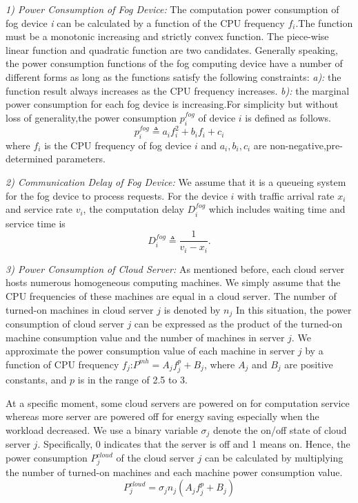 \documentclass[twoside,twocolumn]{article}
\begin{document}
\textit{1) Power Consumption of Fog Device:} The computation power consumption of fog device \textit{i} can be calculated by a function of the CPU frequency $f_i$.The function must be a monotonic increasing and strictly convex function. The piece-wise linear function and quadratic function are two candidates. Generally speaking, the power consumption functions of the fog computing device have a number of different forms as long as the functions satisfy the following constraints: \textit{a):}  the function result always increases as the CPU frequency increases. \textit{b):} the marginal power consumption for each fog device is increasing.For simplicity but without loss of generality,the power consumption $p_i^{fog} $ of device $i$ is defined as follows.
$$ p_i^{fog} \triangleq a_if_i^2+b_if_i+c_i $$
where $f_i$ is the CPU frequency of fog device $i$ and $a_i,b_i,c_i$ are non-negative,pre-determined parameters. 

\textit{2) Communication Delay of Fog Device:} We assume that it is a queueing system for the fog device to process requests. For the device $i$ with traffic arrival rate $x_i$ and service rate $v_i$, the computation delay $D_i^{fog}$ which includes waiting time and service time is 
$$ D_i^{fog} \triangleq \frac{1}{v_i-x_i} .$$

\textit{3) Power Consumption of Cloud Server:} As mentioned before, each cloud server hosts numerous homogeneous computing machines. We simply assume that the CPU frequencies of these machines are equal in a cloud server. The number of turned-on machines in cloud server $j$ is denoted by $n_j$ In this situation, the power consumption of cloud server $j$ can be expressed as the product of the turned-on machine consumption value and the number of machines in server $j$. We approximate the power consumption value of each machine in server $j$ by a function of CPU frequency $f_j$:$P^{mh} = A_jf_j^p+B_j$, where $A_j$ and $B_j$ are positive constants, and $p$ is in the range of 2.5 to 3. 

At a specific moment, some cloud servers are powered on for computation service whereas more server are powered off for energy saving especially when the workload decreased. We use a binary variable $\sigma_j$ denote the on/off state of cloud server $j$. Specifically, 0 indicates that the server is off and 1 means on. Hence, the power consumption $P_j^{cloud}$ of the cloud server $j$ can be calculated by multiplying the number of turned-on machines and each machine power consumption value.
$$P_j^{cloud} = \sigma_jn_j\left(A_jf_j^p+B_j\right)$$
\end{document}
